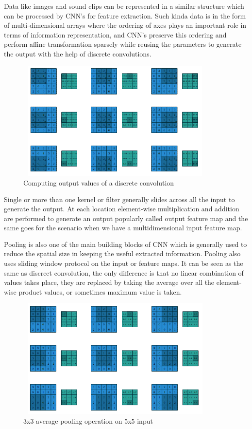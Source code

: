     Data like images and sound clips can be represented in a similar structure which can be processed by CNN's for feature extraction. Such kinda data is in the form of multi-dimensional arrays where the ordering of axes plays an important role in terms of information representation, and CNN's preserve this ordering and perform affine transformation sparsely while reusing the parameters to generate the output with the help of discrete convolutions. 
     \begin{figure}[h]
    \centering
    \includegraphics[width=10cm, height =6cm]{images/discrete_cnn.png}
    \caption{Computing output values of a discrete convolution \cite{https://doi.org/10.48550/arxiv.1603.07285}}
    \end{figure}
    
    Single or more than one kernel or filter generally slides across all the input to generate the output. At each location element-wise multiplication and addition are performed to generate an output popularly called output feature map and the same goes for the scenario when we have a multidimensional input feature map. 
    
    Pooling is also one of the main building blocks of CNN which is generally used to reduce the spatial size in keeping the useful extracted information. Pooling also uses sliding window protocol on the input or feature maps. It can be seen as the same as discreet convolution, the only difference is that no linear combination of values takes place, they are replaced by taking the average over all the element-wise product values, or sometimes maximum value is taken. 
    \begin{figure}[h]
    \centering
    \includegraphics[width=10cm, height =6cm]{images/pooling_cnn.png}
    \caption{3x3 average pooling operation on 5x5 input \cite{https://doi.org/10.48550/arxiv.1603.07285}}
    \end{figure}
    
